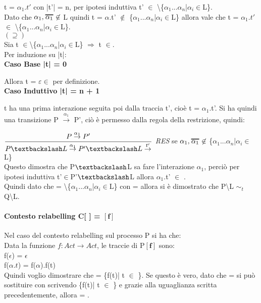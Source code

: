 	t = $\alpha_{1}.t'$ con |t'| = n, per ipotesi induttiva t' $\in$ \textbackslash \{$\alpha_{1}$...$\alpha_{n}$|$\alpha_{i}\in$L\}. \\
	Dato che $\alpha_{1}, \Overline[1pt]{\alpha_{1}} \not\in$ L quindi t = $\alpha$.t' $\not \in$ \{$\alpha_{1}$...$\alpha_{n}$|$\alpha_{i}\in$L\} allora vale che t = $\alpha_{1}.t'$ $\in$ \textbackslash \{$\alpha_{1}$...$\alpha_{n}$|$\alpha_{i}\in$L\}.\\


$(\supseteq)$\\

Sia  t $\in$\textbackslash\{$\alpha_{1}$...$\alpha_{n}$|$\alpha_{i}\in$L\} $\Rightarrow$ t $\in$.   \\
Per induzione su |t|:
\\

\textbf{Caso Base |t| = 0}

Allora t = $\varepsilon \in$  per definizione.
\\

\textbf{Caso Induttivo |t| = n + 1}

t ha una prima interazione seguita poi dalla traccia t', cioè t = $\alpha_{1}$.t'. Si ha quindi una transizione P $\overset{\alpha_{1}}\rightarrow$ P', ciò è permesso dalla regola della restrizione, quindi:

$\dfrac{P \overset{\alpha_{1}}\rightarrow P'}{P\textbackslash L \overset{\alpha_{1}}\rightarrow P'\textbackslash L\overset{t'}\rightarrow}$ \textit{RES} se $\alpha_{1}, \Overline[1pt]{\alpha_{1}} \not\in$ \{$\alpha_{1}$...$\alpha_{n}$|$\alpha_{i}\in$L\}\\

Questo dimostra che P$\textbackslash$L sa fare l'interazione $\alpha_{1}$, perciò per ipotesi induttiva t'$\in$P'$\textbackslash$L allora $\alpha_{1}$.t' $\in$ .
\\

Quindi dato che  = \textbackslash \{$\alpha_{1}$...$\alpha_{n}$|$\alpha_{i}\in$L\} con  =   allora si è dimostrato che  P\textbackslash L $\sim_{t}$ Q\textbackslash L.

\paragraph{Contesto relabelling  C[ ] = $\mathbf{[f]}$ } \mbox{}

Nel caso del contesto relabelling sul processo P si ha che:	\\	
Data la funzione $f: Act \rightarrow Act$, le traccie di P$\mathbf{[f]}$ sono:\\
f($\epsilon$) = $\epsilon$\\
f($\alpha.t$) =  f($\alpha$).f(t)\\
Quindi voglio dimostrare che  = \{f(t)| t $\in$ \}. Se questo è vero, dato che  =   si può sostituire  con  scrivendo \{f(t)| t $\in$ \} e grazie alla uguaglianza scritta precedentemente, allora  = . \\

